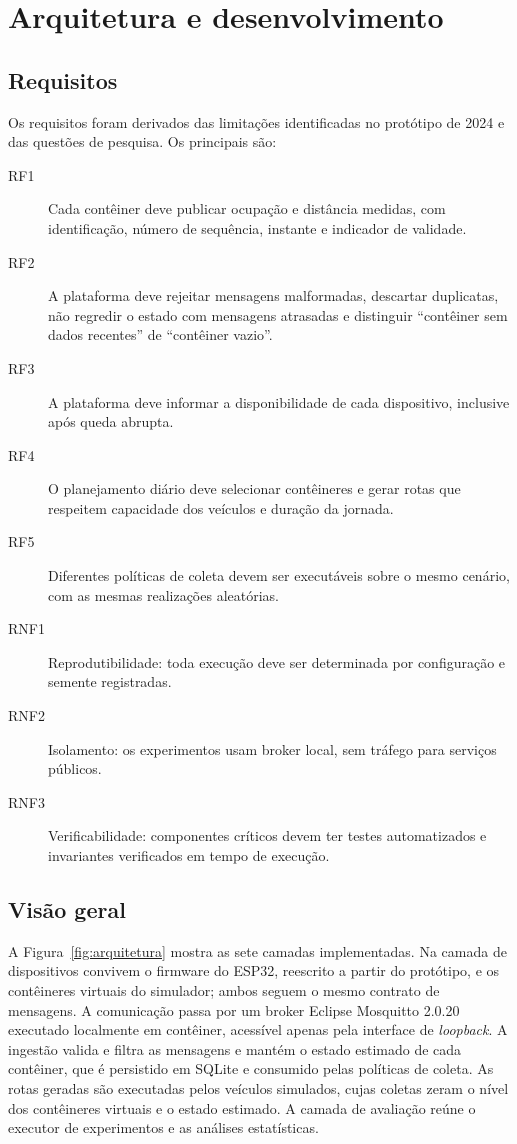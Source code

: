 \section{Arquitetura e desenvolvimento}\label{sec:arquitetura}

\subsection{Requisitos}

Os requisitos foram derivados das limitações identificadas no protótipo de 2024
e das questões de pesquisa. Os principais são:

\begin{description}
  \item[RF1] Cada contêiner deve publicar ocupação e distância medidas, com
  identificação, número de sequência, instante e indicador de validade.
  \item[RF2] A plataforma deve rejeitar mensagens malformadas, descartar
  duplicatas, não regredir o estado com mensagens atrasadas e distinguir
  ``contêiner sem dados recentes'' de ``contêiner vazio''.
  \item[RF3] A plataforma deve informar a disponibilidade de cada dispositivo,
  inclusive após queda abrupta.
  \item[RF4] O planejamento diário deve selecionar contêineres e gerar rotas
  que respeitem capacidade dos veículos e duração da jornada.
  \item[RF5] Diferentes políticas de coleta devem ser executáveis sobre o mesmo
  cenário, com as mesmas realizações aleatórias.
  \item[RNF1] Reprodutibilidade: toda execução deve ser determinada por
  configuração e semente registradas.
  \item[RNF2] Isolamento: os experimentos usam broker local, sem tráfego para
  serviços públicos.
  \item[RNF3] Verificabilidade: componentes críticos devem ter testes
  automatizados e invariantes verificados em tempo de execução.
\end{description}

\subsection{Visão geral}

A Figura~\ref{fig:arquitetura} mostra as sete camadas implementadas. Na
camada de dispositivos convivem o firmware do ESP32, reescrito a partir do
protótipo, e os contêineres virtuais do simulador; ambos seguem o mesmo
contrato de mensagens. A comunicação passa por um broker Eclipse Mosquitto
2.0.20 executado localmente em contêiner, acessível apenas pela interface de
\emph{loopback}. A ingestão valida e filtra as mensagens e mantém o estado
estimado de cada contêiner, que é persistido em SQLite e consumido pelas
políticas de coleta. As rotas geradas são executadas pelos veículos
simulados, cujas coletas zeram o nível dos contêineres virtuais e o estado
estimado. A camada de avaliação reúne o executor de experimentos e as análises
estatísticas.

